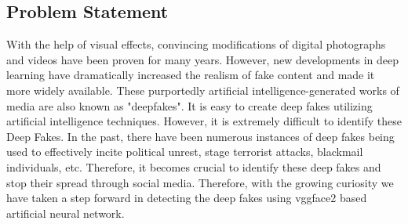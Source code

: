 \subsection{Problem Statement}
With the help of visual effects, convincing modifications of digital photographs and videos have been proven for many years. However, new developments in deep learning have dramatically increased the realism of fake content and made it more widely available. These purportedly artificial intelligence-generated works of media are also known as "deepfakes". It is easy to create deep fakes utilizing artificial intelligence techniques. However, it is extremely difficult to identify these Deep Fakes. In the past, there have been numerous instances of deep fakes being used to effectively incite political unrest, stage terrorist attacks, blackmail individuals, etc. Therefore, it becomes crucial to identify these deep fakes and stop their spread through social media. Therefore, with the growing curiosity we have taken a step forward in detecting the deep fakes using vggface2 based artificial neural network.